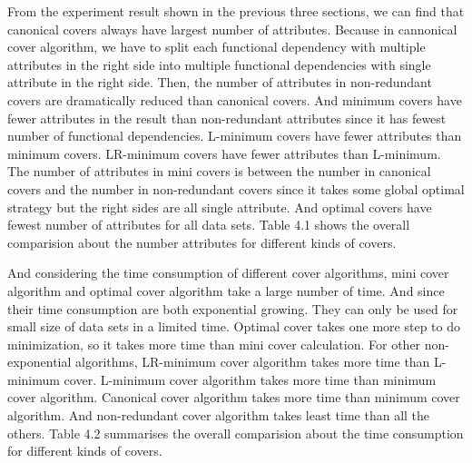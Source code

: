 \documentclass[11pt]{book}
\begin{document}
From the experiment result shown in the previous three sections, we can find that canonical covers always have largest number of attributes. Because in cannonical cover algorithm, we have to split each functional dependency with multiple attributes in the right side into multiple functional dependencies with single attribute in the right side. Then,
the number of attributes in non-redundant covers are dramatically reduced than canonical covers. And minimum covers have fewer attributes in the result than non-redundant attributes since it has fewest number of functional dependencies. L-minimum covers have fewer attributes than minimum covers. LR-minimum covers have fewer attributes than L-minimum. The number of attributes in mini covers is between  the number in canonical covers and the number in non-redundant covers since it takes some global optimal strategy but the right sides are all single attribute. And optimal covers have fewest number of attributes for all data sets. Table 4.1 shows the overall comparision about the number attributes for different kinds of covers.

And considering the time consumption of different cover algorithms, mini cover algorithm and optimal cover algorithm take a large number of time. And since their time consumption are both exponential growing. They can only be used for small size of data sets in a limited time. Optimal cover takes one more step to do minimization, so it takes more time than mini cover calculation. For other non-exponential algorithms, LR-minimum cover algorithm takes more time than L-minimum cover. L-minimum cover algorithm takes more time than minimum cover algorithm. Canonical cover algorithm takes more time than minimum cover algorithm. And non-redundant cover algorithm takes least time than all the others. Table 4.2 summarises the overall comparision about the time consumption for different kinds of covers.
\end{document}
